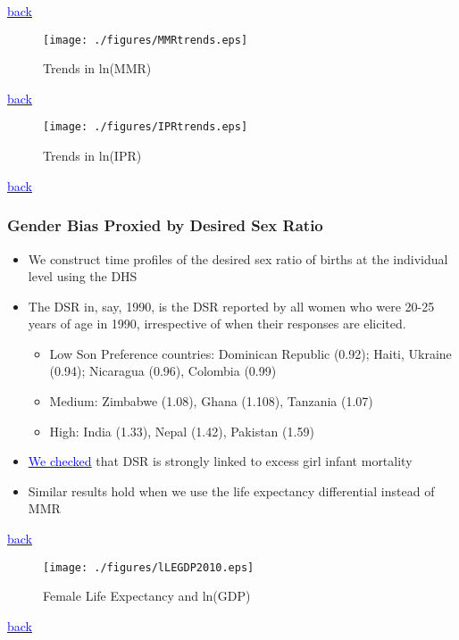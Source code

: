 \documentclass[10pt,letterpaper,subeqn]{beamer}
\begin{document}
\begin{frame}[plain,label=DDreg]

{\footnotesize \hyperlink{USA}{\textcolor{blue}{back}}}
\end{frame}


\begin{frame}[plain,label=ptrends]
\begin{figure}[h!]
\centering
\caption{Trends in ln(MMR)}
\texttt{[image: ./figures/MMRtrends.eps]}
\end{figure}
{\footnotesize \hyperlink{USA}{\textcolor{blue}{back}}}
\end{frame}

\begin{frame}[plain,label=ptrends]
\begin{figure}[h!]
\centering
\caption{Trends in ln(IPR)}
\texttt{[image: ./figures/IPRtrends.eps]}
\end{figure}
{\footnotesize \hyperlink{USA}{\textcolor{blue}{back}}}
\end{frame}

\begin{frame}[label=DSR]
\frametitle{Gender Bias Proxied by Desired Sex Ratio}
\begin{itemize}
\item We construct time profiles of the desired sex ratio of births at the individual level using the DHS
\item The DSR in, say, 1990, is the DSR reported by all women who were 20-25 years of age in 1990, irrespective of when their responses are elicited.
\begin{itemize}
\item Low Son Preference countries: Dominican Republic (0.92); Haiti, Ukraine (0.94); Nicaragua (0.96), Colombia (0.99) 
\item Medium: Zimbabwe (1.08), Ghana (1.108), Tanzania (1.07) 
\item High: India (1.33), Nepal (1.42), Pakistan (1.59)
\end{itemize}
\item \hyperlink{DSRIMR}{\textcolor{blue}{We checked}} that DSR is strongly linked to excess girl infant mortality
\item Similar results hold when we use the life expectancy differential instead of MMR
\end{itemize}
{\footnotesize \hyperlink{CC}{\textcolor{blue}{back}}}
\end{frame}

\begin{frame}[label=trends,plain]
\begin{figure}
\caption{Female Life Expectancy and ln(GDP)}
\texttt{[image: ./figures/lLEGDP2010.eps]}
\end{figure}
\vspace{-8mm}
{\footnotesize \hyperlink{CC1}{\textcolor{blue}{back}}}
\end{frame}
\end{document}
